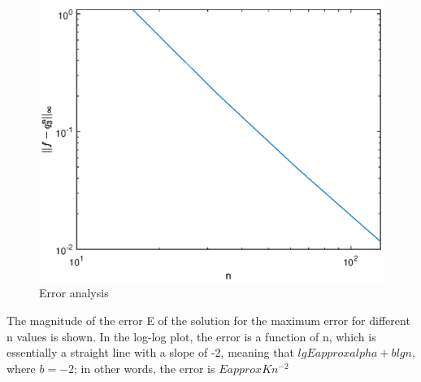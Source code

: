 \documentclass{article}
\numberwithin{equation}{section}    %
\begin{document}
\begin{figure}[htp]
    \centering
    \includegraphics[width=0.45\linewidth]{fig/pic5.eps}
    \caption{Error analysis}

\end{figure}
\clearpage
The magnitude of the error E of the solution for the maximum error for different n values is shown. In the log-log plot, the error is a function of n, which is essentially a straight line with a slope of -2, meaning that $lg E approx alpha + blg n$, where $b=-2$; in other words, the error is $Eapprox Kn^{-2}$
\end{document}
